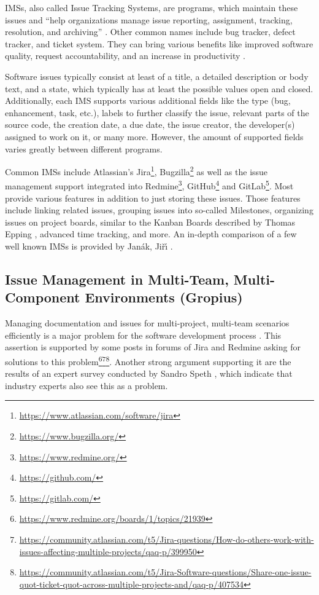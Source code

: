 \glspl{IMS}, also called Issue Tracking Systems, are programs, which maintain these issues 
and ``help organizations manage issue reporting, assignment, tracking, resolution, and archiving'' \cite{bertram2010communication}.
Other common names include bug tracker, defect tracker, and ticket system.
They can bring various benefits like improved software quality, request accountability, and 
an increase in productivity \cite{janak2009issue}. 

Software issues typically consist at least of a title, a detailed description or body text, and a state, 
which typically has at least the possible values open and closed.
Additionally, each \gls{IMS} supports various additional fields like the type (bug, enhancement, task, etc.), 
labels to further classify the issue, relevant parts of the source code, the creation date, a due date, the issue creator, the developer(s) assigned to work on it, or many more.
However, the amount of supported fields varies greatly between different programs.

Common \glspl{IMS} include Atlassian's Jira\footnote{\url{https://www.atlassian.com/software/jira}}, 
Bugzilla\footnote{\url{https://www.bugzilla.org/}} 
as well as the issue management support integrated into Redmine\footnote{\url{https://www.redmine.org/}}, 
GitHub\footnote{\url{https://github.com/}} and 
GitLab\footnote{\url{https://gitlab.com/}}.
Most provide various features in addition to just storing these issues. 
Those features include linking related issues, grouping issues into so-called Milestones, organizing issues on project boards, similar to the Kanban Boards described by Thomas Epping \cite{epping2011kanban}, advanced time tracking, and more.
An in-depth comparison of a few well known \glspl{IMS} is provided by Jan{\'a}k, Ji{\v{r}}{\'\i} \cite{janak2009issue}. 

\subsection{Issue Management in Multi-Team, Multi-Component Environments (Gropius)}
\label{ssec:ch2:ss1.2}
Managing documentation and issues for multi-project, multi-team scenarios efficiently is a major problem for the software development process  \cite{mahmood2015identifying}. This assertion is supported by some posts in forums of Jira and Redmine asking for solutions to this problem\footnote{\url{https://www.redmine.org/boards/1/topics/21939}}\footnote{\url{https://community.atlassian.com/t5/Jira-questions/How-do-others-work-with-issues-affecting-multiple-projects/qaq-p/399950}}\footnote{\url{https://community.atlassian.com/t5/Jira-Software-questions/Share-one-issue-quot-ticket-quot-across-multiple-projects-and/qaq-p/407534}}. Another strong argument supporting it are the results of an expert survey conducted by Sandro Speth \cite{Speth2019}, which indicate that industry experts also see this as a problem.

